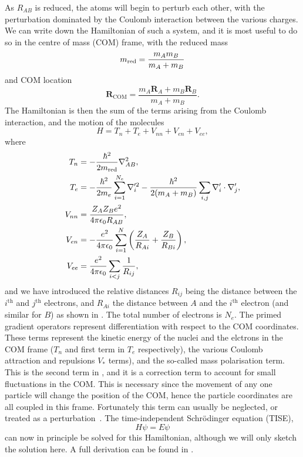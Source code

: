 As $R_{AB}$ is reduced, the atoms will begin to perturb each other, with the
perturbation dominated by the Coulomb interaction between the various charges.
We can write down the Hamiltonian of such a system, and it is most useful to do
so in the centre of mass (COM) frame, with the reduced mass
%
\begin{equation}
  m_\text{red}{} = \frac{m_A m_B}{m_A + m_B}
\end{equation}
%
and COM location
%
\begin{equation}
  \mathbf{R}_\text{COM} = \frac{m_A \mathbf{R}_A + m_B \mathbf{R}_B}{m_A+m_B}.
\end{equation}
%
The Hamiltonian is then the sum of the terms arising from the Coulomb
interaction, and the motion of the molecules
%
\begin{equation}
  H = T_n + T_e + V_{nn} + V_{en} + V_{ee},
\end{equation}
%
where
%
\begin{align}
  T_n &= -\frac{\hbar^2}{2m_\text{red}{}}\nabla_{AB}^2,\\
  T_e &= -\frac{\hbar^2}{2 m_e}\sum_{i=1}^{N_e} \nabla_i'^2 -
  \frac{\hbar^2}{2(m_A + m_B)}\sum_{i, j} \nabla'_i \cdot \nabla'_j, \\
  \label{theory:eqn:mpterm}
  V_{nn} &= \frac{Z_A Z_B e^2}{4\pi\epsilon_0 R_{AB}}, \\
  V_{en} &= - \frac{e^2}{4\pi\epsilon_0}\sum_{i=1}^N \left(\frac{Z_A}{R_{Ai}} + \frac{Z_B}{R_{Bi}}\right), \\
  V_{ee} &= \frac{e^2}{4\pi\epsilon_0}\sum_{i<j} \frac{1}{R_{ij}},
\end{align}
%
and we have introduced the relative distances $R_{ij}$ being the distance
between the $i^\text{th}$ and $j^\text{th}$ electrons, and $R_{Ai}$ the
distance between $A$ and the $i^\text{th}$ electron (and similar for $B$) as
shown in .  The total number of electrons is $N_e$.
The primed gradient operators represent differentiation with respect to the COM
coordinates.
%
These terms represent the kinetic energy of the nuclei and the elctrons
in the COM frame ($T_n$ and first term in $T_e$ respectively), the various
Coulomb attraction and repulsions $V_*$ terms), and the
so-called mass polarisation term. This is the second term in
, and it is a correction term to account for small
fluctuations in the COM. This is necessary since the movement of any one
particle will change the position of the COM, hence the particle coordinates
are all coupled in this frame. Fortunately this term can usually be neglected,
or treated as a perturbation~\cite{brown_carrington_2003, modestrue}.
%
The time-independent Schr\"odinger equation (TISE),
%
\begin{equation}
  H\psi = E\psi
\end{equation}
%
can now in principle be solved for this Hamiltonian, although we will only
sketch the solution here. A full derivation can be found in
.

